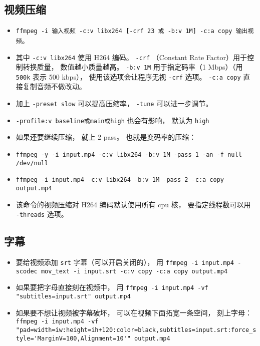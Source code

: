 \subsection{视频压缩}
\begin{itemize}
\item \verb`ffmpeg -i 输入视频 -c:v libx264 [-crf 23 或 -b:v 1M] -c:a copy 输出视频`。
\item 其中 \verb`-c:v libx264` 使用 H264 编码。 \verb`-crf` （Constant Rate Factor）用于控制转换质量， 数值越小质量越高。 \verb`-b:v 1M` 用于指定码率（1 Mbps）（用 \verb`500k` 表示 500 kbps）， 使用该选项会让程序无视 \verb`-crf` 选项。 \verb`-c:a copy` 直接复制音频不做改动。
\item 加上 \verb`-preset slow` 可以提高压缩率， \verb`-tune` 可以进一步调节。
\item \verb`-profile:v baseline或main或high` 也会有影响， 默认为 \verb`high`
\item 如果还要继续压缩， 就上 2 pass。 也就是变码率的压缩：
\item \verb`ffmpeg -y -i input.mp4 -c:v libx264 -b:v 1M -pass 1 -an -f null /dev/null`
\item \verb`ffmpeg -i input.mp4 -c:v libx264 -b:v 1M -pass 2 -c:a copy output.mp4`
\item 该命令的视频压缩对 H264 编码默认使用所有 cpu 核， 要指定线程数可以用 \verb`-threads` 选项。
\end{itemize}

\subsection{字幕}
\begin{itemize}
\item 要给视频添加 \verb`srt` 字幕（可以开启关闭的）， 用 \verb`ffmpeg -i input.mp4 -scodec mov_text -i input.srt -c:v copy -c:a copy output.mp4`
\item 如果要把字母直接刻在视频中， 用 \verb`ffmpeg -i input.mp4 -vf "subtitles=input.srt" output.mp4`
\item 如果要不想让视频被字幕破坏， 可以在视频下面拓宽一条空间， 刻上字母： \verb`ffmpeg -i input.mp4 -vf "pad=width=iw:height=ih+120:color=black,subtitles=input.srt:force_style='MarginV=100,Alignment=10'" output.mp4`
\end{itemize}
